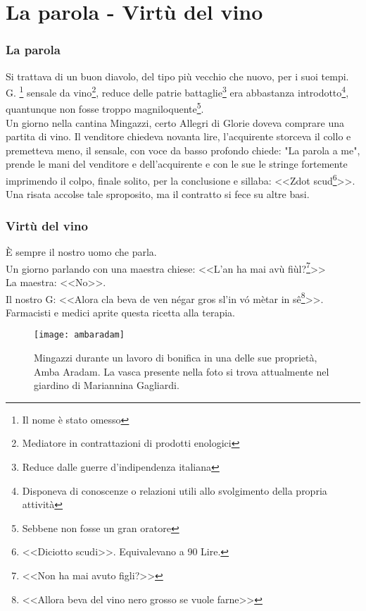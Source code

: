 
\chapter{La parola - Virtù del vino}
\subsection{La parola}
Si trattava di un buon diavolo, del tipo più vecchio che nuovo, per i suoi tempi. G. \: \:\footnote{Il nome è stato omesso} sensale da vino\footnote{Mediatore in contrattazioni di prodotti enologici}, reduce delle patrie battaglie\footnote{Reduce dalle guerre d'indipendenza italiana} era abbastanza introdotto\footnote{Disponeva di conoscenze o relazioni utili allo svolgimento della propria attività}, quantunque non fosse troppo magniloquente\footnote{Sebbene non fosse un gran oratore}.\\
\indent Un giorno nella cantina Mingazzi, certo Allegri di Glorie doveva comprare una partita di vino. Il venditore chiedeva novanta lire, l'acquirente storceva il collo e premetteva meno, il sensale, con voce da basso profondo chiede: "La parola a me", prende le mani del venditore e dell'acquirente e con le sue le stringe fortemente imprimendo il colpo, finale solito, per la conclusione e sillaba: <<Zdot scud\footnote{<<Diciotto scudi>>. Equivalevano a 90 Lire.}>>.\\
\indent Una risata accolse tale sproposito, ma il contratto si fece su altre basi.
\newpage
\subsection{Virtù del vino}
È sempre il nostro uomo che parla.\\
\indent Un giorno parlando con una maestra chiese: <<L'an ha mai avù fiùl?\footnote{<<Non ha mai avuto figli?>>}>>\\
\indent La maestra: <<No>>.\\
\indent Il nostro G: <<Alora cla beva de ven négar gros sl'in vó mètar in sê\footnote{<<Allora beva del vino nero grosso se vuole farne>>}>>.\\
\indent Farmacisti e medici aprite questa ricetta alla terapia. 

\begin{figure}[htb]
    \centering
    \texttt{[image: ambaradam]}
    \caption[Mingazzi durante lavoro di bonifica]{Mingazzi durante un lavoro di bonifica in una delle sue proprietà, Amba Aradam\label{fig:ambaradam}. La vasca presente nella foto si trova attualmente nel giardino di Mariannina Gagliardi.}
\end{figure}
